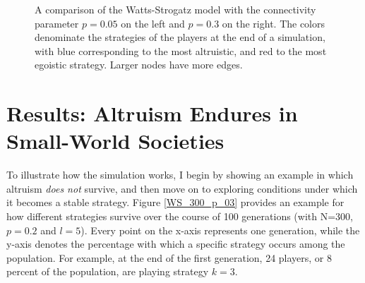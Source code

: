 \documentclass[12pt]{article}
\begin{document}
\begin{figure}%
	\centering
	\qquad
	\caption{A comparison of the Watts-Strogatz model with  the connectivity parameter $p=0.05$ on the left and $p=0.3$ on the right. The colors denominate the strategies of the players at the end of a simulation, with blue corresponding to the most altruistic, and red to the most egoistic strategy. Larger nodes have more edges.}%
	\label{WS_300_illustrate_p}%
\end{figure}

\section*{Results: Altruism Endures in Small-World Societies}
To illustrate how the simulation works, I begin by showing an example in which altruism \textit{does not} survive, and then move on to exploring conditions under which it becomes a stable strategy. Figure \ref{WS_300_p_03} provides an example for how different strategies survive over the course of 100 generations (with N=300, $p=0.2$ and $l=5$). Every point on the x-axis represents one generation, while the y-axis denotes the percentage with which a specific strategy occurs among the population. For example, at the end of the first generation, 24 players, or 8 percent of the population, are playing strategy $k=3$.
\end{document}
